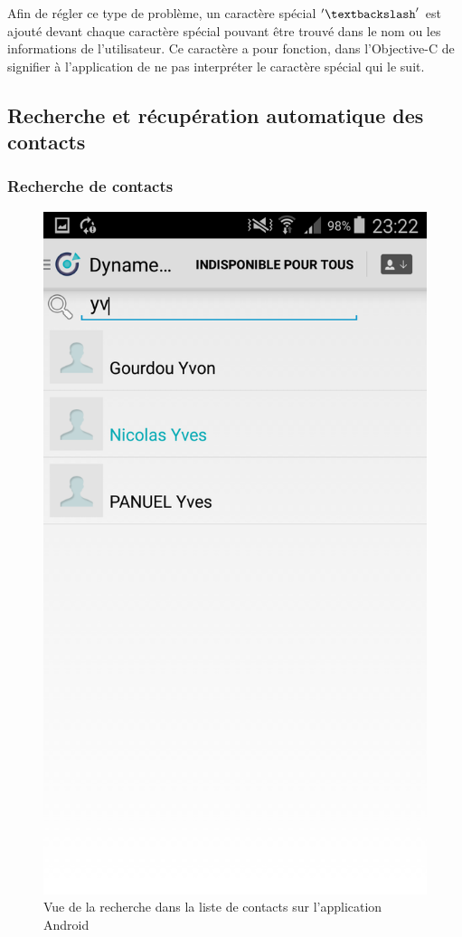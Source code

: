 Afin de régler ce type de problème, un caractère spécial $'\textbackslash'$ est ajouté devant chaque caractère spécial pouvant être trouvé dans le nom ou les informations de l'utilisateur. Ce caractère a pour fonction, dans l'Objective-C de signifier à l'application de ne pas interpréter le caractère spécial qui le suit. 

\subsection{Recherche et récupération automatique des contacts}


\subsubsection{Recherche de contacts}

\begin{figure}[!h]
	\centering
	\includegraphics[scale=0.1]{img/recherche.png}
	\caption{\label{recherche} {Vue de la recherche dans la liste de contacts sur l'application Android}}
\end{figure}

